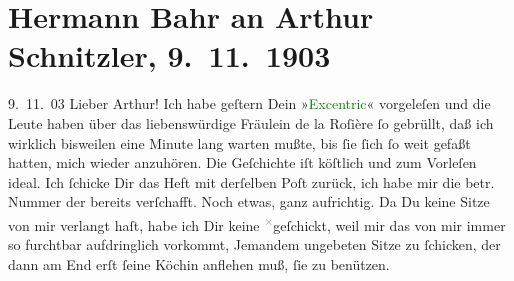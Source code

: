 

               \section[Hermann Bahr an Arthur Schnitzler, 9. 11. 1903]{ Hermann Bahr an Arthur Schnitzler, 9. 11. 1903}\nopagebreak{}\rehead{ }\normalsize\beginnumbering{} \toendnotes[C]{\smallbreak\pagebreak[2]} 
\toendnotes[C]{\smallbreak}\pstart
           \raggedleft{}{\pb}9. 11. 03\pend
           \pstart\center{}Lieber Arthur!\pend\pstart
           Ich habe geſtern Dein »\textcolor{green}{Excentric}{}\ledrightnote{\textcolor{green}{Excentric}}« vorgeleſen und
               die Leute haben über das liebenswürdige Fräulein de la Roſière ſo gebrüllt, daß ich
               wirklich bisweilen eine Minute lang warten mußte, bis ſie ſich ſo weit gefaßt hatten,
               mich wieder anzuhören. Die Geſchichte iſt köſtlich und zum Vorleſen ideal. Ich
               ſchicke Dir das Heft mit derſelben Poſt zurück, ich habe mir die betr. Nummer der
                  \label{K_L01337_1v}\label{K_L01337_1h} bereits
               verſchafft.\pend
           \pstart
           Noch etwas, ganz aufrichtig. Da Du keine Sitze von mir verlangt haſt, habe ich Dir
               keine \substVorne{}\textsuperscript{\textcolor{gray}{×}}\substDazwischen{}g\substHinten{}eſchickt, weil mir das von mir immer so furchtbar aufdringlich vorkommt,
               Jemandem ungebeten Sitze zu ſchicken, der dann am End erſt ſeine Köchin anflehen muß,
               ſie zu benützen.\pend
